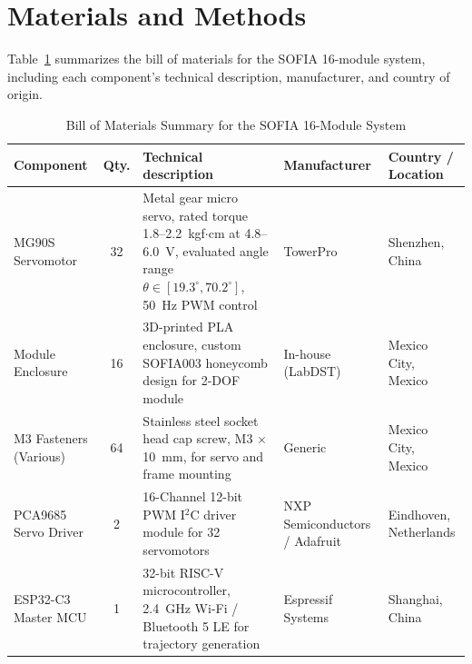 \documentclass[lettersize,journal]{IEEEtran}
\begin{document}
\section{Materials and Methods}
\label{sec:methods}

Table~\ref{tab:bom_sofia} summarizes the bill of materials for the SOFIA 16-module system, including each component's technical description, manufacturer, and country of origin.

\begin{table}[ht]
	\centering
	\caption{Bill of Materials Summary for the SOFIA 16-Module System}
	\label{tab:bom_sofia}
	\scriptsize
	\renewcommand{\arraystretch}{1.3}
	\begin{tabular}{p{3.5cm} c p{6.5cm} p{3.0cm} p{3.0cm}}
		\hline
		\textbf{Component} & \textbf{Qty.} & \textbf{Technical description} & \textbf{Manufacturer} & \textbf{Country / Location} \\
		\hline
		MG90S Servomotor & 32 & Metal gear micro servo, rated torque 1.8--2.2~kgf$\cdot$cm at 4.8--6.0~V, evaluated angle range $\theta \in [19.3^\circ, 70.2^\circ]$, 50~Hz PWM control & TowerPro & Shenzhen, China \\
		
		Module Enclosure & 16 & 3D-printed PLA enclosure, custom SOFIA003 honeycomb design for 2-DOF module & In-house (LabDST) & Mexico City, Mexico \\
		
		M3 Fasteners (Various) & 64 & Stainless steel socket head cap screw, M3 $\times$ 10~mm, for servo and frame mounting & Generic & Mexico City, Mexico \\
		
		PCA9685 Servo Driver & 2 & 16-Channel 12-bit PWM I$^2$C driver module for 32 servomotors & NXP Semiconductors / Adafruit & Eindhoven, Netherlands \\
		
		ESP32-C3 Master MCU & 1 & 32-bit RISC-V microcontroller, 2.4~GHz Wi-Fi / Bluetooth 5 LE for trajectory generation & Espressif Systems & Shanghai, China \\
		\hline
	\end{tabular}
\end{table}
\end{document}
